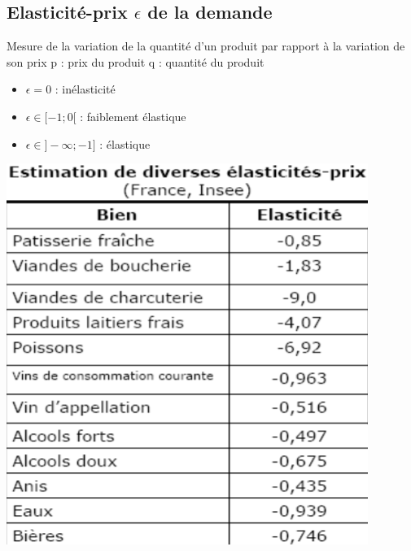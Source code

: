 \subsection{Elasticité-prix $\epsilon$ de la demande}
\begin{center}
\end{center}
Mesure de la variation de la quantité d'un produit par rapport à la variation de son prix
p : prix du produit \newline
q : quantité du produit
\begin{itemize}
    \item $\epsilon = 0 $ : inélasticité
    \item $\epsilon \in [-1;0[$ : faiblement élastique
    \item $\epsilon \in ]-\infty;-1]$ : élastique
\end{itemize}
\begin{center}
    \includegraphics[scale=0.8]{Pics/Elasticite_prix.png}    
\end{center}
\newpage
